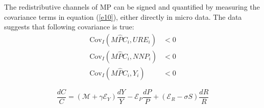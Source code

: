 \documentclass[11pt,letterpaper]{article}
\begin{document}
The redistributive channels of MP can be signed and quantified by measuring the covariance terms in equation (\ref{e10}), either directly in micro data. The data suggests that following covariance is true:  
\begin{align}
	\label{e11} \mathrm{Cov}_{I} (M\widehat{P}C_{i}, URE_{i}) &< 0 \\
	\label{e12} \mathrm{Cov}_{I} (M\widehat{P}C_{i}, NNP_{i}) &< 0 \\
	\label{e13} \mathrm{Cov}_{I} (M\widehat{P}C_{i}, Y_{i}) &< 0
\end{align}



\iffalse 
\begin{equation}
	\gamma_{i} \equiv \frac{\partial \left(\frac{Y_{i}}{Y} - 1 \right) Y}{\left( \frac{Y_{i}}{Y} - 1 \right)} \frac{Y}{\partial Y} 
\end{equation}
\fi

\begin{equation}\label{e18}
	\frac{dC}{C} = ( \mathcal{M} + \gamma \mathcal{E}_{Y}) \frac{dY}{Y} - \mathcal{E}_{P} \frac{dP}{P} + (\mathcal{E}_{R} - \sigma S) \frac{dR}{R} 
\end{equation}
\end{document}
